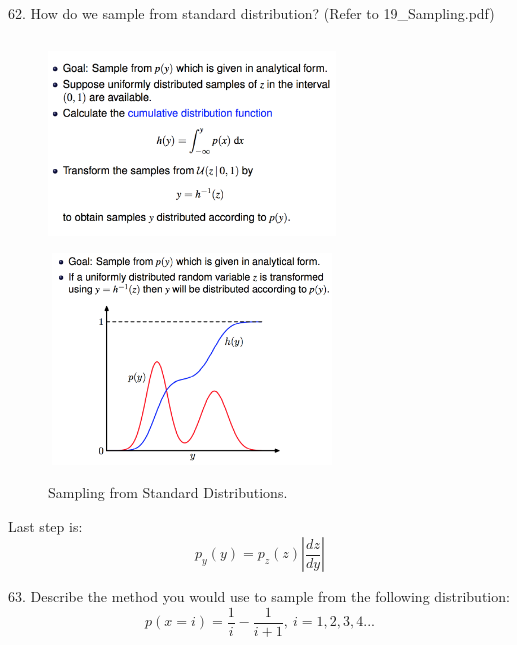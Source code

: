 \documentclass[11pt,a4paper]{article}
\begin{document}
62. How do we sample from standard distribution? (Refer to 19\_Sampling.pdf)
\begin{figure}[H] \centering
    \includegraphics[width=3in,height=2.2in]{./figure/standardSampling_1.png}
    \includegraphics[width=3in,height=2.2in]{./figure/standardSampling_2.png}
    \caption{Sampling from Standard Distributions.}
\end{figure}

Last step is:
$$ p_y (y) = p_z (z) | \frac{dz}{dy}| $$

63. Describe the method you would use to sample from the following distribution:
$$ p(x=i) = \frac{1}{i} - \frac{1}{i+1},\ i = 1,2,3,4 ...$$
\end{document}
